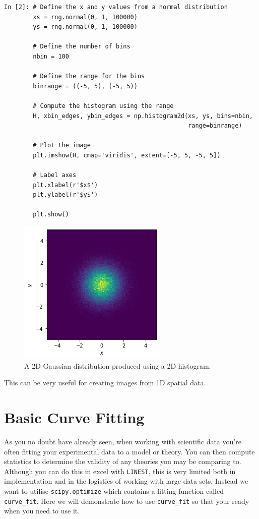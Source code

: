 \newpage

\begin{lstlisting}[style=PY]
In [2]: # Define the x and y values from a normal distribution
        xs = rng.normal(0, 1, 100000)
        ys = rng.normal(0, 1, 100000)
        
        # Define the number of bins
        nbin = 100
        
        # Define the range for the bins
        binrange = ((-5, 5), (-5, 5))
        
        # Compute the histogram using the range
        H, xbin_edges, ybin_edges = np.histogram2d(xs, ys, bins=nbin, 
                                                   range=binrange)
        
        # Plot the image
        plt.imshow(H, cmap='viridis', extent=[-5, 5, -5, 5])
        
        # Label axes
        plt.xlabel(r'$x$')
        plt.ylabel(r'$y$')
        
        plt.show()
\end{lstlisting}

\begin{figure}[H]
	\centering
	\includegraphics[scale=0.7]{Pictures/hist2dexample.png}
\caption{A 2D Gaussian distribution produced using a 2D histogram.}
\label{fig:randimgnoax}
\end{figure}

This can be very useful for creating images from 1D spatial data. 

\newpage

\section{Basic Curve Fitting}

As you no doubt have already seen, when working with scientific data you're often fitting your experimental data to a model or theory. You can then compute statistics to determine the validity of any theories you may be comparing to. Although you can do this in excel with \texttt{LINEST}, this is very limited both in implementation and in the logistics of working with large data sets. Instead we want to utilise \texttt{scipy.optimize} which contains a fitting function called \texttt{curve\_fit}. Here we will demonstrate how to use \texttt{curve\_fit} so that your ready when you need to use it.

